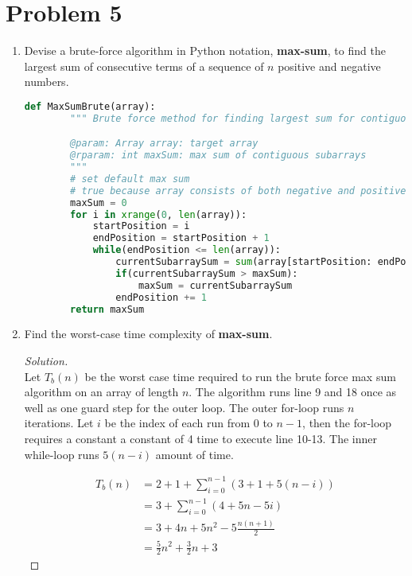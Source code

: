 \documentclass[11pt]{article}
\theoremstyle{plain}%
\theoremstyle{definition}
\theoremstyle{remark}
\newenvironment{solution}
  {\begin{proof}[Solution]}
  {\end{proof}}
\begin{document}
\section*{Problem 5}
\begin{enumerate}
  \item Devise a brute-force algorithm in Python notation, \textbf {max-sum}, to find the largest sum of consecutive terms of a sequence of $n$ positive and negative numbers.

  \begin{lstlisting}[language=Python]
    def MaxSumBrute(array):
        """ Brute force method for finding largest sum for contiguous subarrays of positive and negative number array of size n

        @param: Array array: target array
        @rparam: int maxSum: max sum of contiguous subarrays
        """
        # set default max sum
        # true because array consists of both negative and positive numbers
        maxSum = 0
        for i in xrange(0, len(array)):
            startPosition = i
            endPosition = startPosition + 1
            while(endPosition <= len(array)):
                currentSubarraySum = sum(array[startPosition: endPosition])
                if(currentSubarraySum > maxSum):
                    maxSum = currentSubarraySum
                endPosition += 1
        return maxSum
  \end{lstlisting}
  \item Find the worst-case time complexity of \textbf {max-sum}.

  \begin{solution}
    $ $\\
    Let $T_b(n)$ be the worst case time required to run the brute force max sum algorithm on an array of length $n$. The algorithm runs line 9 and 18 once as well as one guard step for the outer loop. The outer for-loop runs $n$ iterations. Let $i$ be the index of each run from $0$ to $n-1$, then the for-loop requires a constant a constant of 4 time to execute line 10-13. The inner while-loop runs $5(n-i)$ amount of time.

    \begin{align*}
      T_b(n) &= 2 + 1 + \sum_{i=0}^{n-1}( 3 + 1 + 5(n-i))\\
      &= 3 + \sum_{i=0}^{n-1}(4 + 5n - 5i)\\
      &= 3 + 4n + 5n^2 - 5\frac{n(n+1)}{2}\\
      &= \frac{5}{2}n^2 + \frac{3}{2}n + 3
    \end{align*}


\end{solution}
\end{enumerate}
\end{document}
